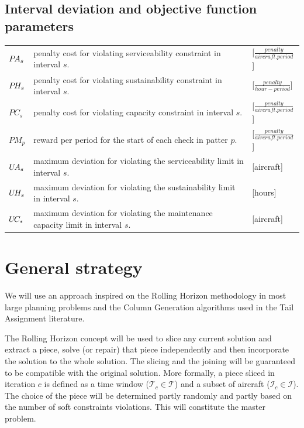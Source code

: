 \documentclass[a4paper,11pt]{article}
\begin{document}
    \subsection{Interval deviation and objective function parameters}

       \begin{tabular}{p{15mm}p{105mm}p{15mm}}
          $P\hspace{-0.5mm}A_s$   & penalty cost for violating serviceability constraint in interval $s$. & [$\frac{penalty}{aircraft.period}$] \\
          $P\hspace{-0.5mm}H_s$   & penalty cost for violating sustainability constraint in interval $s$. & [$\frac{penalty}{hour-period}$] \\
          $PC_s$   & penalty cost for violating capacity constraint in interval $s$. & [$\frac{penalty}{aircraft.period}$]\\
          $PM_p$    & reward per period for the start of each check in patter $p$. & [$\frac{penalty}{aircraft.period}$]\\
          $U\hspace{-0.5mm}A_s$   & maximum deviation for violating the serviceability limit in interval $s$. & [aircraft] \\
          $U\hspace{-0.5mm}H_s$   & maximum deviation for violating the sustainability limit in interval $s$. & [hours] \\
          $U\hspace{-0.5mm}C_s$   & maximum deviation for violating the maintenance capacity limit in interval $s$. & [aircraft] \\
        \end{tabular}

\section{General strategy}

  We will use an approach inspired on the Rolling Horizon methodology in most large planning problems and the Column Generation algorithms used in the Tail Assignment literature. 

  The Rolling Horizon concept will be used to slice any current solution and extract a piece, solve (or repair) that piece independently and then incorporate the solution to the whole solution. The slicing and the joining will be guaranteed to be compatible with the original solution. More formally, a piece sliced in iteration $c$ is defined as a time window ($\mathcal{T}_{c} \in \mathcal{T}$) and a subset of aircraft ($\mathcal{I}_{c} \in \mathcal{I}$). The choice of the piece will be determined partly randomly and partly based on the number of soft constraints violations. This will constitute the master problem.
\end{document}
